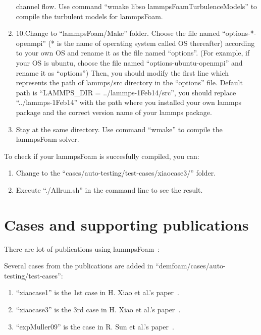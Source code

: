 \documentclass[11pt]{article}
\begin{document}
\begin{enumerate}
        channel flow. Use command ``wmake libso lammpsFoamTurbulenceModels'' to compile the
        turbulent models for lammpsFoam.
    \item 10.Change to ``lammpsFoam/Make'' folder. Choose the file named ``options-*-openmpi'' (* is
      the name of operating system called OS thereafter) according to your own OS and rename it as
      the file named ``options''. (For example, if your OS is ubuntu, choose the file named
      ``options-ubuntu-openmpi'' and rename it as ``options'') Then, you should modify the first
      line which represents the  path of lammps/src directory in the ``options'' file. Default path
      is ``LAMMPS\_DIR = ../lammps-1Feb14/src'', you should replace ``../lammps-1Feb14'' with the
      path where you installed your own lammps package and the correct version name of your lammps
      package.
    \item Stay at the same directory. Use command ``wmake'' to compile the lammpsFoam solver.
\end{enumerate}

To check if your lammpsFoam is succesfully compiled, you can:
\begin{enumerate}
    \item Change to the ``cases/auto-testing/test-cases/xiaocase3/'' folder. 
    \item Execute ``./Allrun.sh'' in the command line to see the result.
\end{enumerate}

\section{Cases and supporting publications}

There are lot of publications using
lammpsFoam~\cite{sun09,xiao-cicp,gupta11a,gupta11b,gupta11b,gxs11a,gupta13a,gupta12,part1,part2}:

Several cases from the publications are added in ``demfoam/cases/auto-testing/test-cases'':
\begin{enumerate}
    \item ``xiaocase1'' is the 1st case in H. Xiao et al.'s paper~\cite{xiao-cicp}.
    \item ``xiaocase3'' is the 3rd case in H. Xiao et al.'s paper~\cite{xiao-cicp}.
    \item ``expMuller09'' is the case in R. Sun et al.'s paper~\cite{part1,part2}.
\end{enumerate}



\end{document}
